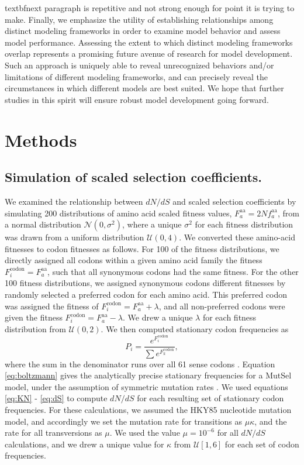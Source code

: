 \documentclass[11pt]{article}
\begin{document}
textbf{next paragraph is repetitive and not strong enough for point it is trying to make.}
Finally, we emphasize the utility of establishing relationships among distinct modeling frameworks in order to examine model behavior and assess model performance. Assessing the extent to which distinct modeling frameworks overlap represents a promising future avenue of research for model development. Such an approach is uniquely able to reveal unrecognized behaviors and/or limitations of different modeling frameworks, and can precisely reveal the circumstances in which different models are best suited. We hope that further studies in this spirit will ensure robust model development going forward.


\section*{Methods}

\subsection*{Simulation of scaled selection coefficients.}

We examined the relationship between $dN/dS$ and scaled selection coefficients by simulating 200 distributions of amino acid scaled fitness values, $F^\text{aa}_a = 2Nf^\text{aa}_a$, from a normal distribution $\mathcal{N}(0,\sigma^2)$, where a unique $\sigma^2$ for each fitness distribution was drawn from a uniform distribution $\mathcal{U}(0,4)$. We converted these amino-acid fitnesses to codon fitnesses as follows. For 100 of the fitness distributions, we directly assigned all codons within a given amino acid family the fitness $F^\text{codon}_i = F^\text{aa}_a$, such that all synonymous codons had the same fitness. For the other 100 fitness distributions, we assigned synonymous codons different fitnesses by randomly selected a preferred codon for each amino acid. This preferred codon was assigned the fitness of $F^\text{codon}_i = F^\text{aa}_a + \lambda$, and all non-preferred codons were given the fitness $F^\text{codon}_i = F^\text{aa}_a - \lambda$. We drew a unique $\lambda$ for each fitness distribution from $\mathcal{U}(0,2)$. 
We then computed stationary codon frequencies as 
\begin{equation}\label{eq:boltzmann}
P_i = \frac{e^{F^\text{codon}_i}}{\sum e^{F^\text{codon}_k}}, 
\end{equation} where the sum in the denominator runs over all 61 sense codons \cite{SellaHirsh2005}. Equation \eqref{eq:boltzmann} gives the analytically precise stationary frequencies for a MutSel model, under the assumption of symmetric mutation rates \cite{SellaHirsh2005}. We used equations \eqref{eq:KN} - \eqref{eq:dS} to compute $dN/dS$ for each resulting set of stationary codon frequencies. For these calculations, we assumed the HKY85 \cite{HKY85} nucleotide mutation model, and accordingly we set the mutation rate for transitions as $\mu\kappa$, and the rate for all transversions as $\mu$. We used the value $\mu = 10^{-6}$ for all $dN/dS$ calculations, and we drew a unique value for $\kappa$ from $\mathcal{U}[1,6]$ for each set of codon frequencies.
\end{document}
